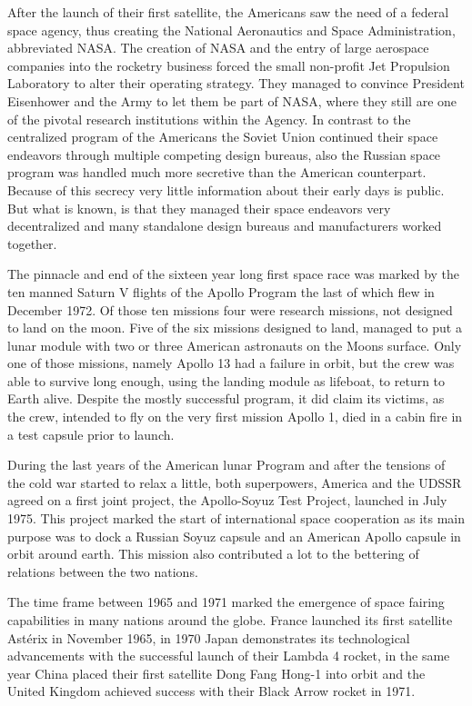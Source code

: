 After the launch of their first satellite, the Americans saw the need of a federal space agency, thus creating the National Aeronautics and Space Administration, abbreviated NASA. The creation of NASA and the entry of large aerospace companies into the rocketry business forced the small  non-profit Jet Propulsion Laboratory to alter their operating strategy. They managed to convince President Eisenhower and the Army to let them be part of NASA, where they still are one of the pivotal research institutions within the Agency. In contrast to the centralized program of the Americans the Soviet Union continued their space endeavors through multiple competing design bureaus, also the Russian space program was handled much more secretive than the American counterpart. Because of this secrecy very little information about their early days is public. But what is known, is that they managed their space endeavors very decentralized and many standalone design bureaus and manufacturers worked together.

The pinnacle and end of the sixteen year long first space race was marked by the ten manned Saturn V flights of the Apollo Program the last of which flew in December 1972. Of those ten missions four were research missions, not designed to land on the moon. Five of the six missions designed to land, managed to put a lunar module with two or three American astronauts on the Moons surface. Only one of those missions, namely Apollo 13 had a failure in orbit, but the crew was able to survive long enough, using the landing module as lifeboat, to return to Earth alive. Despite the  mostly successful program, it did claim its victims, as the crew, intended to fly on the very first mission Apollo 1, died in a cabin fire in a test capsule prior to launch. 

During the last years of the American lunar Program and after the tensions of the cold war started to relax a little, both superpowers, America and the UDSSR agreed on a first joint project, the Apollo-Soyuz Test Project, launched in July 1975. This project marked the start of international space cooperation as its main purpose was to dock a Russian Soyuz capsule and an American Apollo capsule in orbit around earth. This mission also contributed a lot to the bettering of relations between the two nations.

The time frame between 1965 and 1971 marked the emergence of space fairing capabilities in many nations around the globe. France launched its first satellite Astérix in November 1965, in 1970 Japan demonstrates its technological advancements with the successful launch of their Lambda 4 rocket, in the same year China placed their first satellite Dong Fang Hong-1 into orbit and the United Kingdom achieved success with their Black Arrow rocket in 1971.

